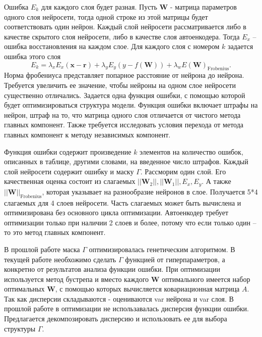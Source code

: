 \documentclass[12pt, twoside]{article}
\newcommand{\xb}{{\mathbf{x}}}
\newenvironment{comment}{}{}
\newcommand{\w}{{\mathbf{W}}}
\newcommand{\wm}{{\mathbf{w}}}
\begin{document}


\begin{comment}

Ошибка $E_k$ для каждого слоя будет разная. Пусть $\w$ - матрица параметров одного слоя нейросети, тогда одной строке из этой матрицы будет соответствовать один нейрон. Каждый слой нейросети рассматривается либо в качестве скрытого слоя нейросети, либо в качестве слоя автоенкодера. Тогда $E_x$ – ошибка восстановления на каждом слое. Для каждого слоя с номером $k$ задается ошибка этого слоя
\begin{equation}\label{eq4}
E_k = \lambda_xE_x(\xb-\mathbf{r})+\lambda_yE_y(y-f(\w)) +\lambda_wE(\w)_\text{Frobenius}. 
\end{equation}
Норма фробениуса представляет попарное расстояние от нейрона до нейрона. Требуется увеличить ее значение, чтобы нейроны на одном слое нейросети существенно отличались. Задается одна функция ошибки, с помощью которой будет оптимизироваться структура модели.
Функция ошибки включает штрафы на нейрон, штраф на то, что матрица одного слоя отличается от чистого метода главных компонент. Также требуется исследовать условия перехода от метода главных компонент к методу независимых компонент.

Функция ошибки содержит произведение $k$ элементов на количество ошибок, описанных в таблице, другими словами, на введенное число штрафов. Каждый слой нейросети содержит ошибку и маску $\Gamma$.
Рассморим один слой. Его качественная оценка состоит из слагаемых $||\w_2||, ||\w_1||, E_x, E_y$. А также $||\w||_{\text{Frobenius}}$, которая указывает на разнообразие нейронов в слое. Получается 5*4 слагаемых для 4 слоев нейросети. 
Часть слагаемых может быть вычислена и оптимизирована без основного цикла оптимизации. Автоенкодер требует оптимизации только при наличии 2 слоев и более, потому что если только один – то это метод главных компонент. 
\end{comment}
\begin{comment}



В прошлой работе маска $\Gamma$ оптимизировалась генетическим алгоритмом. В текущей работе необхожимо сделать $\Gamma$ функцией от гиперпараметров, а конкретно от результатов анализа функции ошибки.
При оптимизации используется метод бустрепа и вместо каждого $\w$ оптимального имеется набор оптимальных $\w$, с помощью которых вычисляется ковариационная матрица $A$. Так как дисперсии складываются -  оцениваются var нейрона и var слоя. В прошлой работе в оптимизации не использавалась дисперсия функции ошибки.
Предлагается декомпозировать дисперсию и использовать ее для выбора структуры $\Gamma$. 

\end{comment}
\end{document}
